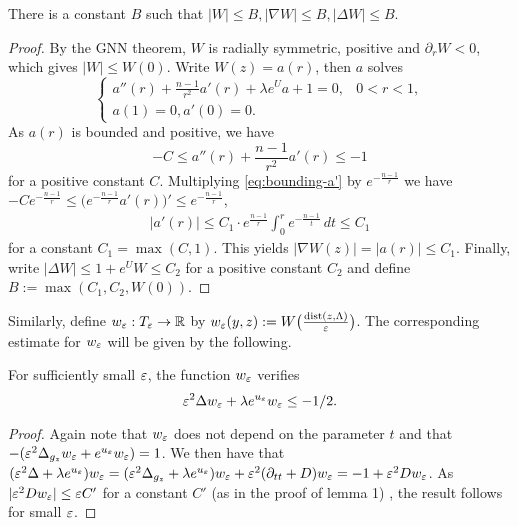 \begin{lemma} There is a constant $B$ such that $|W|\leq B, |\nabla W|\leq
B, |\Delta W|\leq B$.
\end{lemma}
\begin{proof}
By the GNN theorem, $W$ is radially symmetric, positive and $\partial_r W<0$,
which gives $|W|\leq W(0)$. Write $W(z)=a(r)$, then $a$ solves
\begin{equation}
\left\{
\begin{array}{lc}
a''(r)+\frac{n-1}{r^2}a'(r)+\lambda e^Ua+1=0, & 0<r<1,\\
a(1) = 0, a'(0) = 0. &
\end{array}
\right.
\end{equation}
As $a(r)$ is bounded and positive, we have 
\begin{equation}
    \label{eq:bounding-a'}
-C\leq a''(r)+\frac{n-1}{r^2}a'(r)\leq -1
\end{equation}
for a positive constant $C$.
Multiplying \ref{eq:bounding-a'} by $e^{-\frac{n-1}{r}}$ we have $
-Ce^{-\frac{n-1}{r}}\leq \big(e^{-\frac{n-1}{r}}a'(r)\big)'\leq
e^{-\frac{n-1}{r}}$, \ie  
\begin{eqnarray*}
    |a'(r)|\leq  C_1\cdot e^{\frac{n-1}{r}}\int_0^re^{-\frac{n-1}{t}}\, dt \leq
    C_1  
\end{eqnarray*}
for a constant $C_1=\max(C,1)$. This yields $|\nabla W(z)|=|a(r)|\leq C_1$.
Finally, write $|\Delta W|\leq 1+e^UW\leq C_2$ for a positive constant $C_2$
and define $B:=\max(C_1,C_2,W(0))$.

\end{proof}

Similarly, define $w_\varepsilon:T_\varepsilon\to \mathbb{R}$ by
$w_\varepsilon(y,z):=W\big(\frac{\operatorname{dist}(z,\Lambda)}{\varepsilon}\big)$. The
corresponding estimate for $w_\varepsilon$ will be given by the following. 

\begin{lemma}
For sufficiently small $\varepsilon$, the function $w_\varepsilon$ verifies
\begin{equation}
    \label{eq-lemma--1/2}
\varepsilon^2 \Delta w_\varepsilon + \lambda e^{u_\varepsilon}w_\varepsilon \leq -1/2.
\end{equation}
\end{lemma}

\begin{proof}
Again note that $w_\varepsilon$ does not depend on the parameter $t$ and that
$-(\varepsilon^2\Delta_{g_z}w_\varepsilon + e^{u_\varepsilon}w_\varepsilon)=1$. We then have that $(\varepsilon^2\Delta
+ \lambda e^{u_\varepsilon})w_\varepsilon = (\varepsilon^2\Delta_{g_z}+\lambda
e^{u_\varepsilon})w_\varepsilon+\varepsilon^2(\partial_{tt} + D)w_\varepsilon = -1+\varepsilon^2Dw_\varepsilon$. As $|\varepsilon^2
Dw_\varepsilon|\leq \varepsilon C'$ for a constant $C'$ (as in the proof of lemma 1)
, the result follows for small $\varepsilon$.
\end{proof}

